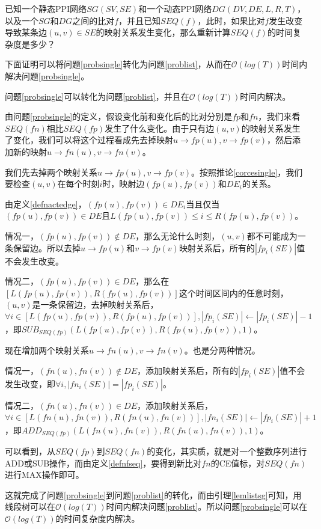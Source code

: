 \begin{prob}[维护CE指标的问题]
\label{probsingle}
已知一个静态PPI网络$SG(SV,SE)$和一个动态PPI网络$DG(DV,DE,L,R,T)$，以及一个$SG$和$DG$之间的比对$f$，并且已知$SEQ(f)$，此时，如果比对$f$发生改变导致某条边$(u,v)\in SE$的映射关系发生变化，那么重新计算$SEQ(f)$的时间复杂度是多少？
\end{prob}

下面证明可以将问题\ref{probsingle}转化为问题\ref{problist}，从而在$\mathcal{O}(log(T))$时间内解决问题\ref{probsingle}。

\begin{thm}
\label{thmtrans}
问题\ref{probsingle}可以转化为问题\ref{problist}，并且在$\mathcal{O}(log(T))$时间内解决。
\end{thm}
\begin{proof2}
由问题\ref{probsingle}的定义，假设变化前和变化后的比对分别是$fp$和$fn$，我们来看$SEQ(fn)$相比$SEQ(fp)$发生了什么变化。由于只有边$(u,v)$的映射关系发生了变化，我们可以将这个过程看成先去掉映射$u\rightarrow fp(u),v\rightarrow fp(v)$，然后添加新的映射$u\rightarrow fn(u),v\rightarrow fn(v)$。

我们先去掉两个映射关系$u\rightarrow fp(u),v\rightarrow fp(v)$。按照推论\ref{corcesingle}，我们要检查$(u,v)$在每个时刻$i$时，映射边$(fp(u),fp(v))$和$DE_i$的关系。

由定义\ref{defnactedge}，$(fp(u),fp(v))\in DE_i$当且仅当$(fp(u),fp(v))\in DE$且$L(fp(u),fp(v))\leq i\leq R(fp(u),fp(v))$。

情况一，$(fp(u),fp(v))\notin DE$，那么无论什么时刻，$(u,v)$都不可能成为一条保留边。所以去掉$u\rightarrow fp(u)$和$v\rightarrow fp(v)$映射关系后，所有的$|fp_i(SE)|$值不会发生改变。

情况二，$(fp(u),fp(v))\in DE$，那么在$[L(fp(u),fp(v)),R(fp(u),fp(v))]$这个时间区间内的任意时刻，$(u,v)$是一条保留边，去掉映射关系后，$\forall i\in [L(fp(u),fp(v)),R(fp(u),fp(v))],|fp_i(SE)|\leftarrow |fp_i(SE)|-1$，即$SUB_{SEQ(fp)}(L(fp(u),fp(v)),R(fp(u),fp(v)),1)$。

现在增加两个映射关系$u\rightarrow fn(u),v\rightarrow fn(v)$。也是分两种情况。

情况一，$(fn(u),fn(v))\notin DE$，添加映射关系后，所有的$|fp_i(SE)|$值不会发生改变，即$\forall i,|fn_i(SE)|=|fp_i(SE)|$。

情况二，$(fn(u),fn(v))\in DE$，添加映射关系后，$\forall i\in [L(fn(u),fn(v)),R(fn(u),fn(v))],|fn_i(SE)|\leftarrow |fp_i(SE)|+1$，即$ADD_{SEQ(fp)}(L(fn(u),fn(v)),R(fn(u),fn(v)),1)$。

可以看到，从$SEQ(fp)$到$SEQ(fn)$的变化，其实质，就是对一个整数序列进行ADD或SUB操作，而由定义\ref{defnfseq}，要得到新比对$fn$的CE值标，对$SEQ(fn)$进行MAX操作即可。

这就完成了问题\ref{probsingle}到问题\ref{problist}的转化，而由引理\ref{lemlistsg}可知，用线段树可以在$\mathcal{O}(log(T))$时间内解决问题\ref{problist}。所以问题\ref{probsingle}可以在$\mathcal{O}(log(T))$的时间复杂度内解决。
\end{proof2}

